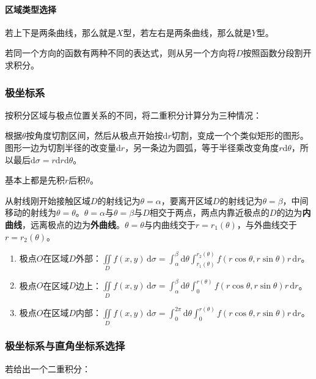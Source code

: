 \paragraph{区域类型选择} \leavevmode \medskip

若上下是两条曲线，那么就是$X$型，若左右是两条曲线，那么就是$Y$型。

若同一个方向的函数有两种不同的表达式，则从另一个方向将$D$按照函数分段割开求积分。

\subsubsection{极坐标系}

按积分区域与极点位置关系的不同，将二重积分计算分为三种情况：

根据$\theta$按角度切割区间，然后从极点开始按$\textrm{d}r$切割，变成一个个类似矩形的图形。图形一边为切割半径的改变量$\textrm{d}r$，另一条边为圆弧，等于半径乘改变角度$r\textrm{d}\theta$，所以最后$\textrm{d}\sigma=r\textrm{d}r\textrm{d}\theta$。

基本上都是先积$r$后积$\theta$。

从射线刚开始接触区域$D$的射线记为$\theta=\alpha$，要离开区域$D$的射线记为$\theta=\beta$，中间移动的射线为$\theta=\theta$。$\theta=\alpha$与$\theta=\beta$与$D$相交于两点，两点内靠近极点的$D$的边为\textbf{内曲线}，远离极点的边为\textbf{外曲线}。$\theta=\theta$与内曲线交于$r=r_1(\theta)$，与外曲线交于$r=r_2(\theta)$。

\begin{enumerate}
    \item 极点$O$在区域$D$外部：$\iint\limits_Df(x,y)\,\textrm{d}\sigma=\int_\alpha^\beta\textrm{d}\theta\int_{r_1(\theta)}^{r_2(\theta)}f(r\cos\theta,r\sin\theta)r\,\textrm{d}r$。
    \item 极点$O$在区域$D$边上：$\iint\limits_Df(x,y)\,\textrm{d}\sigma=\int_\alpha^\beta\textrm{d}\theta\int_0^{r(\theta)}f(r\cos\theta,r\sin\theta)r\,\textrm{d}r$。
    \item 极点$O$在区域$D$内部：$\iint\limits_Df(x,y)\,\textrm{d}\sigma=\int_0^{2\pi}\textrm{d}\theta\int_0^{r(\theta)}f(r\cos\theta,r\sin\theta)r\,\textrm{d}r$。
\end{enumerate}

\subsubsection{极坐标系与直角坐标系选择}

若给出一个二重积分：

